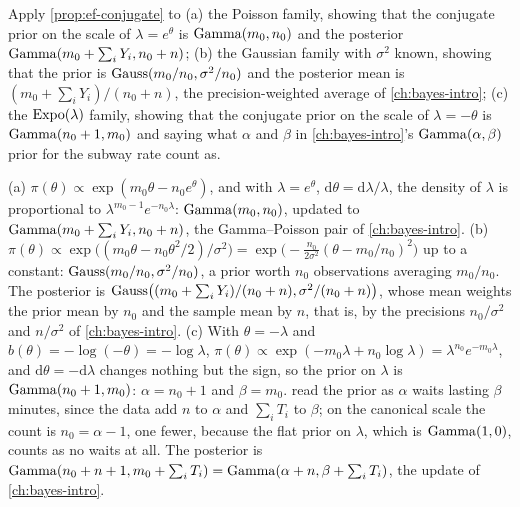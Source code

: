 \begin{exercise}
\label{ex:ef-conjugate}
Apply \cref{prop:ef-conjugate} to (a) the Poisson family, showing that the conjugate prior on the scale of $\lambda = e^\theta$ is $\mathrm{Gamma}(m_0, n_0)$ and the posterior $\mathrm{Gamma}(m_0 + \sum_i Y_i, n_0 + n)$; (b) the Gaussian family with $\sigma^2$ known, showing that the prior is $\text{Gauss}(m_0/n_0, \sigma^2/n_0)$ and the posterior mean is $(m_0 + \sum_i Y_i)/(n_0 + n)$, the precision-weighted average of \cref{ch:bayes-intro}; (c) the $\text{Expo}(\lambda)$ family, showing that the conjugate prior on the scale of $\lambda = -\theta$ is $\mathrm{Gamma}(n_0 + 1, m_0)$ and saying what $\alpha$ and $\beta$ in \cref{ch:bayes-intro}'s $\mathrm{Gamma}(\alpha, \beta)$ prior for the subway rate count as.
\end{exercise}
\begin{solution}
(a) $\pi(\theta) \propto \exp(m_0\theta - n_0e^\theta)$, and with $\lambda = e^\theta$, $\mathrm{d}\theta = \mathrm{d}\lambda/\lambda$, the density of $\lambda$ is proportional to $\lambda^{m_0 - 1}e^{-n_0\lambda}$: $\mathrm{Gamma}(m_0, n_0)$, updated to $\mathrm{Gamma}(m_0 + \sum_i Y_i, n_0 + n)$, the Gamma--Poisson pair of \cref{ch:bayes-intro}. (b) $\pi(\theta) \propto \exp\big((m_0\theta - n_0\theta^2/2)/\sigma^2\big) = \exp\big(-\frac{n_0}{2\sigma^2}(\theta - m_0/n_0)^2\big)$ up to a constant: $\text{Gauss}(m_0/n_0, \sigma^2/n_0)$, a prior worth $n_0$ observations averaging $m_0/n_0$. The posterior is $\text{Gauss}\big((m_0 + \sum_i Y_i)/(n_0 + n), \sigma^2/(n_0 + n)\big)$, whose mean weights the prior mean by $n_0$ and the sample mean by $n$, that is, by the precisions $n_0/\sigma^2$ and $n/\sigma^2$ of \cref{ch:bayes-intro}. (c) With $\theta = -\lambda$ and $b(\theta) = -\log(-\theta) = -\log\lambda$, $\pi(\theta) \propto \exp(-m_0\lambda + n_0\log\lambda) = \lambda^{n_0}e^{-m_0\lambda}$, and $\mathrm{d}\theta = -\mathrm{d}\lambda$ changes nothing but the sign, so the prior on $\lambda$ is $\mathrm{Gamma}(n_0 + 1, m_0)$: $\alpha = n_0 + 1$ and $\beta = m_0$.  read the prior as $\alpha$ waits lasting $\beta$ minutes, since the data add $n$ to $\alpha$ and $\sum_i T_i$ to $\beta$; on the canonical scale the count is $n_0 = \alpha - 1$, one fewer, because the flat prior on $\lambda$, which is $\mathrm{Gamma}(1, 0)$, counts as no waits at all. The posterior is $\mathrm{Gamma}(n_0 + n + 1, m_0 + \sum_i T_i) = \mathrm{Gamma}(\alpha + n, \beta + \sum_i T_i)$, the update of \cref{ch:bayes-intro}.
\end{solution}

